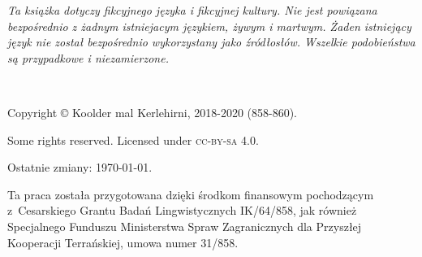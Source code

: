 \emph{Ta książka dotyczy fikcyjnego języka i fikcyjnej kultury. Nie jest
powiązana bezpośrednio z żadnym istniejacym językiem, żywym i martwym. Żaden
istniejący język nie został bezpośrednio wykorzystany jako źródłosłów. Wszelkie
podobieństwa są przypadkowe i niezamierzone.}

~\vfill

\begingroup
\setlength\parindent{0pt}\footnotesize
Copyright © Koolder mal Kerlehirni, 2018-2020 (858-860).

\bigskip

Some rights reserved. Licensed under \textsc{cc-by-sa} 4.0.

Ostatnie zmiany: \today{}.

\medskip

Ta praca została przygotowana dzięki środkom finansowym
pochodzącym z~Cesarskiego Grantu Badań Lingwistycznych IK/64/858,
jak również Specjalnego Funduszu Ministerstwa Spraw Zagranicznych dla
Przyszłej Kooperacji Terrańskiej, umowa numer 31/858.

\endgroup
